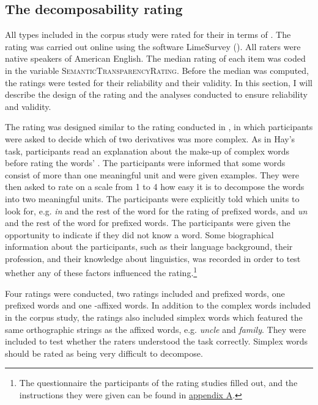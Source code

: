 






\subsection{The decomposability rating} \label{decomposability rating corpus}

All types included in the corpus study were rated for their  in terms of . The rating was carried out online using the software LimeSurvey (\citealt{LimeSurveyProjectTeam.2015}). All raters were native speakers of American English. The median rating of each item was coded in the variable  \textsc{SemanticTransparencyRating}. Before the median was computed, the ratings were tested for their reliability and their validity. In this section, I will describe the design of the rating and the analyses conducted to ensure reliability and validity. 

The rating was designed similar to the rating conducted in \cite{Hay.2001}, in which participants were asked to decide which of two derivatives was more complex. As in Hay's task,  participants read an explanation about the make-up of complex words before rating the words' .  The participants were informed that some words consist of more than one meaningful unit and were given examples. 
They were then asked to rate on a scale from 1 to 4 how easy it is to decompose the words into two meaningful units. The participants were explicitly told which units to look for, e.g.\textit{ in} and the rest of the word for the rating of prefixed words, and \textit{un} and the rest of the word for prefixed words. The participants were given the opportunity to  indicate if they did not know a word. 
Some biographical information about the participants, such as their language background, their profession, and their knowledge about linguistics, was recorded in order to test whether any of these factors influenced the rating.\footnote{The questionnaire the participants of the rating studies filled out, and the instructions they were given can be found in \hyperref[Appendix A: Decomposability Rating]{appendix A}. } 

Four ratings were conducted, two ratings included  and prefixed words, one  prefixed words and one -affixed words. In addition to the complex words included in the corpus study, the ratings also included simplex words which featured the same orthographic strings as the affixed words, e.g. \textit{{un}cle} and \textit{fami{ly}}. They were included to test whether the raters understood the task correctly. Simplex words should be rated as being very difficult to decompose. 

